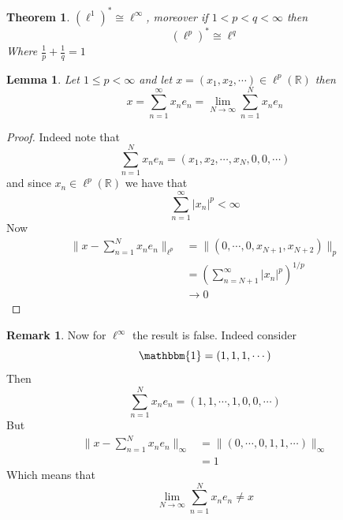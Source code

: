 \documentclass[11pt,a4paper]{article}
\theoremstyle{definition}
\newtheorem{remark}[definition]{Remark}
\theoremstyle{plain}
\newtheorem{theorem}[definition]{Theorem}
\newtheorem{lemma}[definition]{Lemma}
\theoremstyle{remark}
\newcommand{\R}{\mathbb{R}}
\newcommand{\abs}[1]{\lvert #1 \rvert}
\newcommand{\norm}[1]{\lVert #1 \rVert}
\newcommand{\1}{\mathbbm{1}}
\begin{document}
\begin{theorem}
    $(\ell^1)^* \cong \ell^\infty$, moreover if $1 < p < q < \infty$ then 
    $$(\ell^p)^* \cong \ell^q$$
    Where $\frac{1}{p} + \frac{1}{q} = 1$
\end{theorem}

\begin{lemma}
    Let $1 \le p < \infty$ and let $x = (x_1, x_2, \cdots) \in \ell^p(\R)$ then 
    $$x = \sum_{n=1}^\infty x_n e_n = \lim_{N \to \infty} \sum_{n=1}^N x_n e_n$$
\end{lemma}

\begin{proof}
    Indeed note that 
    $$\sum_{n=1}^N x_n e_n = (x_1, x_2, \cdots, x_N, 0, 0, \cdots)$$
    and since $x_n \in \ell^p(\R)$ we have that 
    $$\sum_{n=1}^\infty \abs{x_n}^p < \infty$$
    Now 
    \begin{align*}
        \norm{x - \sum_{n=1}^N x_n e_n}_{\ell^p} &= \norm{(0,\cdots, 0, x_{N+1}, x_{N+2})}_p \\
        &= \left(\sum_{n=N+1}^\infty \abs{x_n}^p \right)^{1/p} \\
        &\to 0
    \end{align*}
\end{proof}

\begin{remark}
    Now for $\ell^\infty$ the result is false. Indeed consider 
    $$\1 = (1, 1, 1, \cdots)$$
    Then 
    $$\sum_{n=1}^N x_n e_n = (1,1,\cdots, 1, 0,0,\cdots)$$
    But 
    \begin{align*}
        \norm{x- \sum_{n=1}^N x_n e_n}_\infty &= \norm{(0,\cdots, 0, 1,1,\cdots)}_\infty \\
        &= 1
    \end{align*}
    Which means that 
    $$\lim_{N \to \infty} \sum_{n=1}^N x_n e_n \ne x$$
\end{remark}
\end{document}
